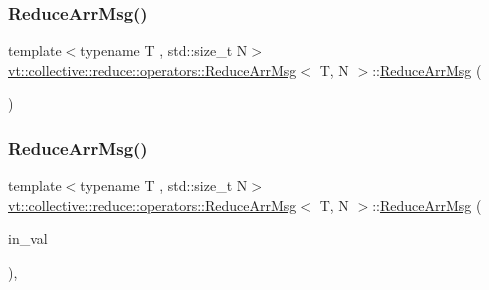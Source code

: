 \subsubsection{\texorpdfstring{Reduce\+Arr\+Msg()}{ReduceArrMsg()}\hspace{0.1cm}{\footnotesize\ttfamily [1/3]}}
{\footnotesize\ttfamily template$<$typename T , std\+::size\+\_\+t N$>$ \\
\hyperlink{structvt_1_1collective_1_1reduce_1_1operators_1_1_reduce_arr_msg}{vt\+::collective\+::reduce\+::operators\+::\+Reduce\+Arr\+Msg}$<$ T, N $>$\+::\hyperlink{structvt_1_1collective_1_1reduce_1_1operators_1_1_reduce_arr_msg}{Reduce\+Arr\+Msg} (\begin{DoxyParamCaption}{ }\end{DoxyParamCaption})\hspace{0.3cm}{\ttfamily [default]}}

\mbox{\label{structvt_1_1collective_1_1reduce_1_1operators_1_1_reduce_arr_msg_a88bdfa2c0fad10fd90331f00272c5816}} 
\subsubsection{\texorpdfstring{Reduce\+Arr\+Msg()}{ReduceArrMsg()}\hspace{0.1cm}{\footnotesize\ttfamily [2/3]}}
{\footnotesize\ttfamily template$<$typename T , std\+::size\+\_\+t N$>$ \\
\hyperlink{structvt_1_1collective_1_1reduce_1_1operators_1_1_reduce_arr_msg}{vt\+::collective\+::reduce\+::operators\+::\+Reduce\+Arr\+Msg}$<$ T, N $>$\+::\hyperlink{structvt_1_1collective_1_1reduce_1_1operators_1_1_reduce_arr_msg}{Reduce\+Arr\+Msg} (\begin{DoxyParamCaption}\item[{\hyperlink{structvt_1_1collective_1_1reduce_1_1operators_1_1_reduce_arr_msg_aea7790c640396dc428ddc98a1e0e7c7c}{Data\+Type} \&\&}]{in\+\_\+val }\end{DoxyParamCaption})\hspace{0.3cm}{\ttfamily [inline]}, {\ttfamily [explicit]}}

